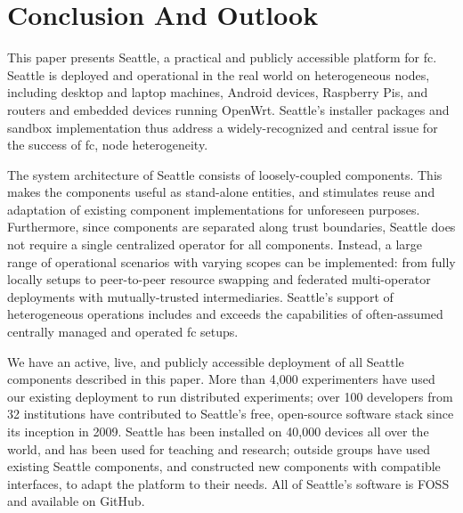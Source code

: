 \section{Conclusion And Outlook}

This paper presents Seattle, a practical and publicly accessible
platform for \gls{fc}. Seattle is deployed and operational in the
real world on heterogeneous nodes,
including desktop and laptop machines, Android devices,
Raspberry Pis,
and routers and embedded devices running OpenWrt.
Seattle's installer packages and sandbox implementation
thus address a widely-recognized and central issue for the
success of \gls{fc}, node heterogeneity.

The system architecture of Seattle consists of loosely-coupled
components. This makes the components useful as stand-alone entities,
and stimulates reuse and adaptation of existing component
implementations for unforeseen purposes.
Furthermore, since components are separated along trust boundaries,
Seattle does not require a single centralized operator for all
components. Instead, a large range of operational scenarios with
varying scopes can be implemented: from fully locally setups to
peer-to-peer resource swapping and federated multi-operator
deployments with mutually-trusted intermediaries.
Seattle's support of heterogeneous operations includes and exceeds
the capabilities of often-assumed centrally managed and
operated \gls{fc} setups.

We have an active, live, and publicly accessible deployment of all
Seattle components described in this paper.
More than 4,000 experimenters have used our existing deployment
to run distributed experiments; over 100 developers from 32 institutions
have contributed to Seattle's free, open-source software stack since
its inception in 2009.
Seattle has been installed on 40,000 devices all over the world, and
has been used
for teaching and research; outside groups have used existing Seattle
components, and constructed new components with compatible interfaces,
to adapt the platform to their needs.
All of Seattle's software is \acrlong{FOSS} and available on GitHub.

